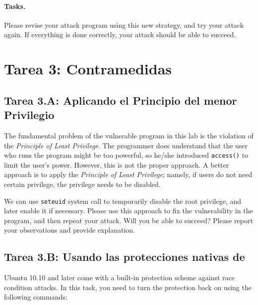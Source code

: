 \paragraph{Tasks.} Please revise your attack program using 
this new strategy, and try your attack again. If everything 
is done correctly, your attack should be able to succeed. 



\section{Tarea 3: Contramedidas}



\subsection{Tarea 3.A: Aplicando el Principio del menor Privilegio}

The fundamental problem of the vulnerable program in this lab is 
the violation of the {\em Principle of Least Privilege}. 
The programmer does understand that the user who runs the program 
might be too powerful, so he/she introduced {\tt access()} to limit the user's 
power. However, this is not the proper approach. A better
approach is to apply the {\em Principle of Least Privilege}; 
namely, if users do not need certain privilege, the privilege
needs to be disabled.

We can use {\tt seteuid{}} system call to temporarily disable
the root privilege, and later enable it if necessary. Please use 
this approach to fix the vulnerability in the program, and then
repeat your attack. Will you be able to succeed? Please report your
observations and provide explanation.



\subsection{Tarea 3.B: Usando las protecciones nativas de \ubuntu}

Ubuntu 10.10 and later come with a built-in protection scheme against race condition
attacks. In this task, you need to turn the protection back on using the
following commands:

